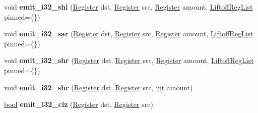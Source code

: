 \begin{DoxyCompactItemize}
\mbox{\label{classv8_1_1internal_1_1wasm_1_1LiftoffAssembler_ad7612f8e936ce96a06463f369bf30c3e}} 
void {\bfseries emit\+\_\+i32\+\_\+shl} (\mbox{\hyperlink{classv8_1_1internal_1_1Register}{Register}} dst, \mbox{\hyperlink{classv8_1_1internal_1_1Register}{Register}} src, \mbox{\hyperlink{classv8_1_1internal_1_1Register}{Register}} amount, \mbox{\hyperlink{classv8_1_1internal_1_1wasm_1_1LiftoffRegList}{Liftoff\+Reg\+List}} pinned=\{\})
\item 
\mbox{\label{classv8_1_1internal_1_1wasm_1_1LiftoffAssembler_acf68fa4ca58aa1535cd7f51d191258dd}} 
void {\bfseries emit\+\_\+i32\+\_\+sar} (\mbox{\hyperlink{classv8_1_1internal_1_1Register}{Register}} dst, \mbox{\hyperlink{classv8_1_1internal_1_1Register}{Register}} src, \mbox{\hyperlink{classv8_1_1internal_1_1Register}{Register}} amount, \mbox{\hyperlink{classv8_1_1internal_1_1wasm_1_1LiftoffRegList}{Liftoff\+Reg\+List}} pinned=\{\})
\item 
\mbox{\label{classv8_1_1internal_1_1wasm_1_1LiftoffAssembler_afef3c80deaef6b06cc909cff71a5a39b}} 
void {\bfseries emit\+\_\+i32\+\_\+shr} (\mbox{\hyperlink{classv8_1_1internal_1_1Register}{Register}} dst, \mbox{\hyperlink{classv8_1_1internal_1_1Register}{Register}} src, \mbox{\hyperlink{classv8_1_1internal_1_1Register}{Register}} amount, \mbox{\hyperlink{classv8_1_1internal_1_1wasm_1_1LiftoffRegList}{Liftoff\+Reg\+List}} pinned=\{\})
\item 
\mbox{\label{classv8_1_1internal_1_1wasm_1_1LiftoffAssembler_abb8789a74586c210d282c7e1fcb7b718}} 
void {\bfseries emit\+\_\+i32\+\_\+shr} (\mbox{\hyperlink{classv8_1_1internal_1_1Register}{Register}} dst, \mbox{\hyperlink{classv8_1_1internal_1_1Register}{Register}} src, \mbox{\hyperlink{classint}{int}} amount)
\item 
\mbox{\label{classv8_1_1internal_1_1wasm_1_1LiftoffAssembler_a16d980623514996354fa2ca60d4206e7}} 
\mbox{\hyperlink{classbool}{bool}} {\bfseries emit\+\_\+i32\+\_\+clz} (\mbox{\hyperlink{classv8_1_1internal_1_1Register}{Register}} dst, \mbox{\hyperlink{classv8_1_1internal_1_1Register}{Register}} src)
\item 

\end{DoxyCompactItemize}
